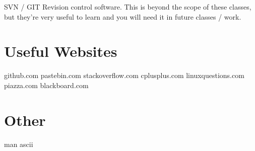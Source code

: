 \documentclass[letterpaper,10pt,titlepage,fleqn]{article}
\begin{document}
SVN / GIT 
Revision control software. This is beyond the scope of these classes, but they’re very useful to learn and you will need it in future classes / work.



\section{Useful Websites}

github.com
pastebin.com
stackoverflow.com
cplusplus.com
linuxquestions.com
piazza.com
blackboard.com


\section{Other}
man ascii
\end{document}
